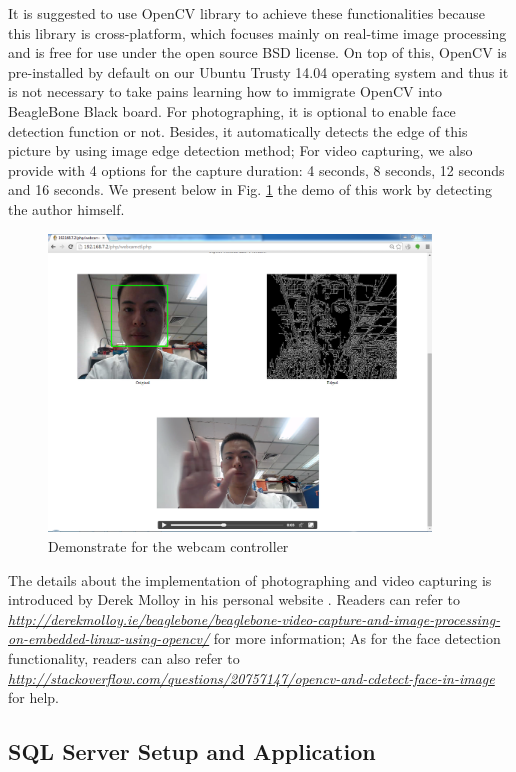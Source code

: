 \documentclass[12pt,journal,draftclsnofoot,onecolumn]{IEEEtran}
\begin{document}
It is suggested to use OpenCV library to achieve these functionalities because this library is cross-platform, which focuses mainly on real-time image processing and is free for use under the open source BSD license.
On top of this, OpenCV is pre-installed by default on our Ubuntu Trusty 14.04 operating system and thus it is not necessary to take pains learning how to immigrate OpenCV into BeagleBone Black board. For photographing, it is optional to enable face detection function or not. Besides, it automatically detects the edge of this picture by using image edge detection method;  For video capturing, we also provide with 4 options for the capture duration: 4 seconds, 8 seconds, 12 seconds and 16 seconds.  We present below in Fig. \ref{webcamdemo} the demo of this work by detecting the author himself.
\begin{figure}[htb]
	\centering
	\includegraphics[width=4in]{./figs/webcam3.PNG}
	\caption{Demonstrate for the webcam controller}
	\label{webcamdemo}
\end{figure}


The details about the implementation of photographing and video capturing is introduced by Derek Molloy in his personal website \cite{molloy}.
Readers can refer to \textcolor{blue}{\textit{\url{http://derekmolloy.ie/beaglebone/beaglebone-video-capture-and-image-processing-on-embedded-linux-using-opencv/}}}
for more information; As for the face detection functionality, readers can also refer to \textcolor{blue}{\textit{\url{http://stackoverflow.com/questions/20757147/opencv-and-cdetect-face-in-image}}} for help.



\subsection{SQL Server Setup and Application}\label{Sql}
\end{document}
